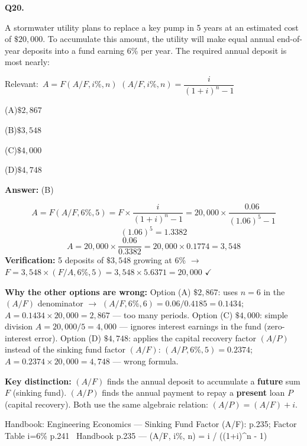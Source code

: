 \documentclass[11pt]{article}
\newcommand{\correct}[1]{\textbf{#1}\;{\color{accent}$\checkmark$}}
\newcommand{\optline}[2]{\par\noindent\hspace{1.2em}(#1)\hspace{0.6em}#2}
\begin{document}
\vspace{9pt}
\filbreak
\textbf{\color{accent}Q20.}\par\vspace{2pt}
A stormwater utility plans to replace a key pump in 5 years at an estimated cost of $\$20{,}000$. To accumulate this amount, the utility will make equal annual end-of-year deposits into a fund earning 6\% per year. The required annual deposit is most nearly:\par\par\vspace{3pt}
{\small\color{soft}Relevant:}\ $A = F(A/F, i\%, n)$ \quad $(A/F, i\%, n) = \dfrac{i}{(1+i)^n - 1}$\par\vspace{3pt}
\optline{A}{$\$2{,}867$}
\optline{B}{\correct{$\$3{,}548$}}
\optline{C}{$\$4{,}000$}
\optline{D}{$\$4{,}748$}
\par\vspace{3pt}
\vspace{2pt}\par\noindent\colorbox{boxbg}{\parbox{\dimexpr\linewidth-2\fboxsep\relax}{%
\vspace{2pt}\textbf{Answer:} (B)\par\vspace{2pt}
{\small \[A = F(A/F, 6\%, 5) = F \times \frac{i}{(1+i)^n - 1} = 20{,}000 \times \frac{0.06}{(1.06)^5 - 1}\]
\[(1.06)^5 = 1.3382\]
\[A = 20{,}000 \times \frac{0.06}{0.3382} = 20{,}000 \times 0.1774 = 3{,}548\]
\textbf{Verification:} 5 deposits of $\$3{,}548$ growing at 6\% $\rightarrow$ $F = 3{,}548 \times (F/A, 6\%, 5) = 3{,}548 \times 5.6371 = 20{,}000$ $\checkmark$\par
\textbf{Why the other options are wrong:} Option (A) $\$2{,}867$: uses $n = 6$ in the $(A/F)$ denominator $\rightarrow$ $(A/F, 6\%, 6) = 0.06/0.4185 = 0.1434$; $A = 0.1434 \times 20{,}000 = 2{,}867$ --- too many periods. Option (C) $\$4{,}000$: simple division $A = 20{,}000 / 5 = 4{,}000$ --- ignores interest earnings in the fund (zero-interest error). Option (D) $\$4{,}748$: applies the capital recovery factor $(A/P)$ instead of the sinking fund factor $(A/F)$: $(A/P, 6\%, 5) = 0.2374$; $A = 0.2374 \times 20{,}000 = 4{,}748$ --- wrong formula.\par
\textbf{Key distinction:} $(A/F)$ finds the annual deposit to accumulate a \textbf{future} sum $F$ (sinking fund). $(A/P)$ finds the annual payment to repay a \textbf{present} loan $P$ (capital recovery). Both use the same algebraic relation: $(A/P) = (A/F) + i$.\par}\par\vspace{2pt}
{\footnotesize\color{soft}Handbook: Engineering Economics --- Sinking Fund Factor (A/F): p.235; Factor Table i=6\% p.241 \textbullet\ Handbook p.235 --- (A/F, i\%, n) = i / ((1+i)\textasciicircum{}n - 1)}\vspace{2pt}
}}
\vspace{9pt}
\end{document}
